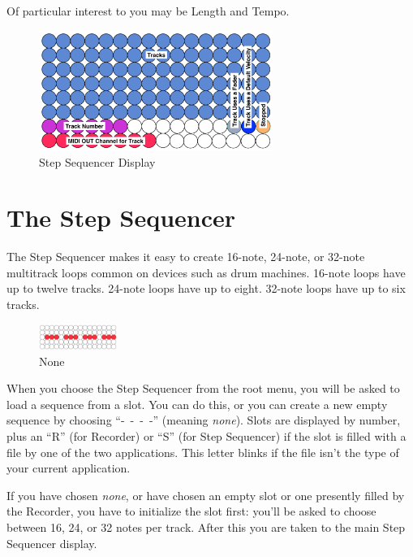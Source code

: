 \documentclass{article}
\begin{document}
\vspace{1em}
Of particular interest to you may be Length and Tempo.

\begin{figure}
\vspace{-4em}\includegraphics[width=3in]{stepsequencer}
\vspace{-2em}\caption{\small Step Sequencer Display}\vspace{-1em}
\label{stepsequencer}
\end{figure}

\section {The Step Sequencer}

The Step Sequencer makes it easy to create 16-note, 24-note, or 32-note multitrack loops common on devices such as drum machines.  16-note loops have up to twelve tracks.  24-note loops have up to eight.  32-note loops have up to six tracks.

\begin{figure}
\vspace{-1.5em}\includegraphics[width=1in]{none.pdf}
\vspace{-2em}\caption{\small None}\vspace{-1em}
\label{none}
\end{figure}

When you choose the Step Sequencer from the root menu, you will be asked to load a sequence from a slot.  You can do this, or you can create a new empty sequence by choosing ``-~-~-~-'' (meaning {\it none}).  Slots are displayed by number, plus an ``R'' (for Recorder) or ``S'' (for Step Sequencer) if the slot is filled with a file by one of the two applications.  This letter blinks if the file isn't the type of your current application.

If you have chosen {\it none}, or have chosen an empty slot or one presently filled by the Recorder, you have to initialize the slot first: you'll be asked to choose between 16, 24, or 32 notes per track. After this you are taken to the main Step Sequencer display.  
\end{document}
